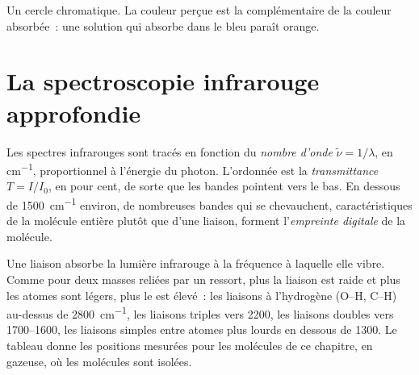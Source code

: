 \begin{omfigure}

{\small Un cercle chromatique. La couleur perçue est la complémentaire de
la couleur absorbée~: une solution qui absorbe dans le bleu paraît
orange.}
\end{omfigure}

\section{La spectroscopie infrarouge approfondie}

\begin{definition}\label{def:b1:structure-spectroscopy:wavenumber}
Les spectres infrarouges sont tracés en fonction du \emph{nombre
d'onde} $\tilde\nu = 1/\lambda$, en \unit{cm^{-1}},
proportionnel à l'énergie du photon. L'ordonnée est la
\emph{transmittance}
$T = I/I_0$, en pour cent, de sorte que les bandes pointent vers le bas.
En dessous de \qty{1500}{cm^{-1}} environ, de nombreuses bandes qui se
chevauchent, caractéristiques de la molécule entière plutôt que d'une
liaison, forment l'\emph{empreinte
digitale} de la molécule.
\end{definition}

Une liaison absorbe la lumière infrarouge à la fréquence à laquelle
elle vibre. Comme pour deux masses reliées par un ressort, plus la
liaison est raide et plus les atomes sont légers, plus le 
est élevé~: les liaisons à l'hydrogène (O--H, C--H) au-dessus de
\qty{2800}{cm^{-1}}, les liaisons triples vers 2200, les liaisons
doubles vers 1700--1600, les liaisons simples entre atomes plus lourds
en dessous de 1300. Le tableau donne les positions mesurées pour les
molécules de ce chapitre, en  gazeuse, où les molécules sont
isolées.

